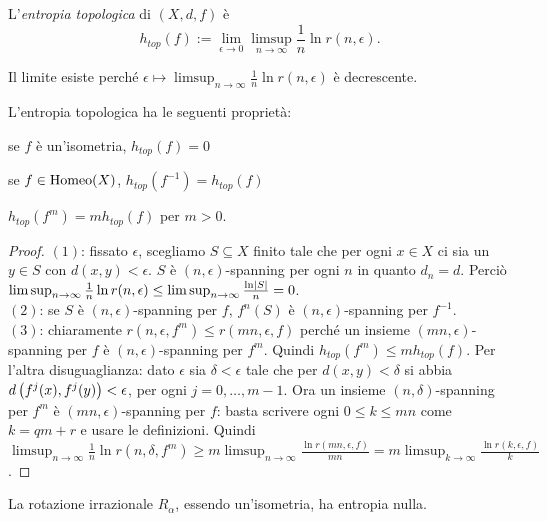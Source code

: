 \begin{defi}L'\emph{entropia topologica} di $(X,d,f)$ è
\[ h_{top}(f):=\lim_{\epsilon\to 0}\limsup_{n\to\infty}\frac{1}{n}\ln r(n,\epsilon). \]
\end{defi}

Il limite esiste perché $\epsilon\mapsto\limsup_{n\to\infty}\frac{1}{n}\ln r(n,\epsilon)$ è decrescente.

\begin{prop}L'entropia topologica ha le seguenti proprietà:
\begin{lista}
\item se $f$ è un'isometria, $h_{top}(f)=0$
\item se $f\in\operatorname{Homeo}(X)$, $h_{top}(f^{-1})=h_{top}(f)$
\item $h_{top}(f^m)=mh_{top}(f)$ per $m>0$.
\end{lista}
\end{prop}

\begin{proof}$(1)$: fissato $\epsilon$, scegliamo $S\subseteq X$ finito tale che per ogni $x\in X$
ci sia un $y\in S$ con $d(x,y)<\epsilon$. $S$ è $(n,\epsilon)$-spanning per ogni $n$ in quanto $d_n=d$.
Perciò $\limsup_{n\to\infty}\frac{1}{n}\ln r(n,\epsilon)\le\limsup_{n\to\infty}\frac{\ln\left|S\right|}{n}=0$. \\
$(2)$: se $S$ è $(n,\epsilon)$-spanning per $f$, $f^n(S)$ è $(n,\epsilon)$-spanning per $f^{-1}$. \\
$(3)$: chiaramente $r(n,\epsilon,f^m)\le r(mn,\epsilon,f)$ perché un insieme $(mn,\epsilon)$-spanning per $f$
è $(n,\epsilon)$-spanning per $f^m$. Quindi $h_{top}(f^m)\le m h_{top}(f)$.
Per l'altra disuguaglianza: dato $\epsilon$ sia $\delta<\epsilon$ tale che per $d(x,y)<\delta$ si abbia $d\left(f^j(x),f^j(y)\right)<\epsilon$,
per ogni $j=0,\dots,m-1$. Ora un insieme $(n,\delta)$-spanning per $f^m$ è $(mn,\epsilon)$-spanning per $f$:
basta scrivere ogni $0\le k\le mn$ come $k=qm+r$ e usare le definizioni.
Quindi $\limsup_{n\to\infty}\frac{1}{n}\ln r(n,\delta,f^m)\ge m\limsup_{n\to\infty}\frac{\ln r(mn,\epsilon,f)}{mn}
=m\limsup_{k\to\infty}\frac{\ln r(k,\epsilon,f)}{k}$.
\end{proof}

\begin{esempio}La rotazione irrazionale $R_\alpha$, essendo un'isometria, ha entropia nulla.
\end{esempio}

